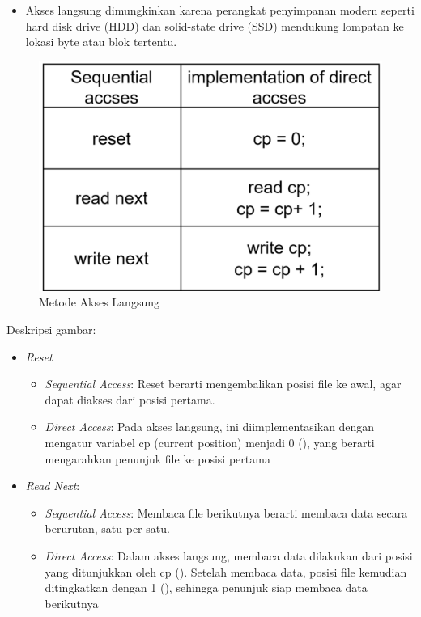 \documentclass[12pt]{article}
\begin{document}
\begin{enumerate}
\begin{itemize}
        \item Akses langsung dimungkinkan karena perangkat penyimpanan modern seperti hard disk drive (HDD) dan solid-state drive (SSD) mendukung lompatan ke lokasi byte atau blok tertentu.
    \end{itemize}

    \begin{figure}[h]
        \centering
        \includegraphics[width=0.5\linewidth]{assets/p2.png}
        \caption{Metode Akses Langsung}
        \label{fig:sequential-access}
    \end{figure}

    {Deskripsi gambar:}
     \begin{itemize}
        \item \textit{Reset}
        \begin{itemize}
            \item \textit{Sequential Access}: Reset berarti mengembalikan posisi file ke awal, agar dapat diakses dari posisi pertama.
            
            \item \textit{Direct Access}: Pada akses langsung, ini diimplementasikan dengan mengatur variabel cp (current position) menjadi 0 (), yang berarti mengarahkan penunjuk file ke posisi pertama
        
        \end{itemize}

        \item \textit{Read Next}:
        \begin{itemize}
        \item \textit{Sequential Access}: Membaca file berikutnya berarti membaca data secara berurutan, satu per satu.

        \item \textit{Direct Access}: Dalam akses langsung, membaca data dilakukan dari posisi yang ditunjukkan oleh cp (). Setelah membaca data, posisi file kemudian ditingkatkan dengan 1 (), sehingga penunjuk siap membaca data berikutnya
        

\end{itemize}
\end{itemize}
\end{enumerate}
\end{document}
